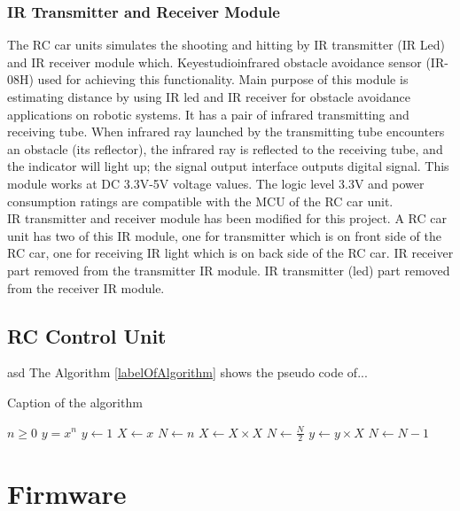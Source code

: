 \subsubsection{IR Transmitter and Receiver Module}
The RC car units simulates the shooting and hitting by IR transmitter (IR Led) and IR receiver module which. Keyestudio\texttrademark\;infrared obstacle avoidance sensor (IR-08H) used for achieving this functionality. Main purpose of this module is estimating distance by using IR led and IR receiver for obstacle avoidance applications on robotic systems. It has a pair of infrared transmitting and receiving tube. When infrared ray launched by the transmitting tube encounters an obstacle (its reflector), the infrared ray is reflected to the receiving tube, and the indicator will light up; the signal output interface outputs digital signal. This module works at DC 3.3V-5V voltage values. The logic level 3.3V and power consumption ratings are compatible with the MCU of the RC car unit.\\

IR transmitter and receiver module has been modified for this project. A RC car unit has two of this IR module, one for transmitter which is on front side of the RC car, one for receiving IR light which is on back side of the RC car. IR receiver part removed from the transmitter IR module. IR transmitter (led) part removed from the receiver IR module. 



\subsection{RC Control Unit}
asd
The Algorithm \ref{labelOfAlgorithm} shows the pseudo code of...
\begin{algorithm}
\caption{Caption of the algorithm}
\label{labelOfAlgorithm}
\begin{algorithmic}
\Require $n \geq 0$ %
\Ensure $y = x^n$  %
\State $y \gets 1$
\State $X \gets x$
\State $N \gets n$
    \State $X \gets X \times X$
    \State $N \gets \frac{N}{2}$  
    \State $y \gets y \times X$
    \State $N \gets N - 1$
\EndIf
\EndWhile
\end{algorithmic}
\end{algorithm}

\section{Firmware} \label{sec_firmware_design}


